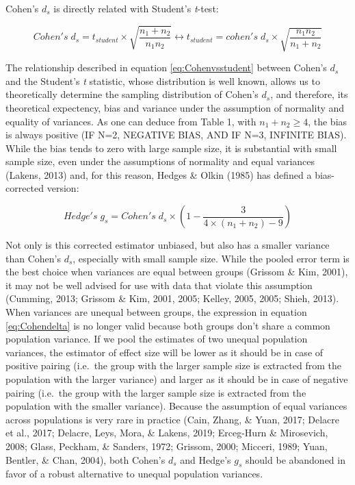 \documentclass[
  man,floatsintext]{apa6}
\begin{document}
Cohen's \(d_{s}\) is directly related with Student's \emph{t}-test:

\begin{equation} 
Cohen's \; d_s = t_{student} \times \sqrt{\frac{n_1+n_2}{n_1n_2}} \leftrightarrow t_{student} = cohen's \; d_s \times \sqrt{\frac{n_1n_2}{n_1+n_2}}
\label{eq:Cohenvsstudent}
\end{equation}

The relationship described in equation \ref{eq:Cohenvsstudent} between Cohen's \(d_s\) and the Student's \emph{t} statistic, whose distribution is well known, allows us to theoretically determine the sampling distribution of Cohen's \(d_s\), and therefore, its theoretical expectency, bias and variance under the assumption of normality and equality of variances. As one can deduce from Table 1, with \(n_1+n_2 \ge 4\), the bias is always positive (IF N=2, NEGATIVE BIAS, AND IF N=3, INFINITE BIAS). While the bias tends to zero with large sample size, it is substantial with small sample size, even under the assumptions of normality and equal variances (Lakens, 2013) and, for this reason, Hedges \& Olkin (1985) has defined a bias-corrected version:

\begin{equation} 
Hedge's \; g_s = Cohen's \; d_s \times (1-\frac{3}{4 \times (n_1+n_2)-9}) 
\label{eq:Hedgesgs}
\end{equation}

Not only is this corrected estimator unbiased, but also has a smaller variance than Cohen's \(d_s\), especially with small sample size. While the pooled error term is the best choice when variances are equal between groups (Grissom \& Kim, 2001), it may not be well advised for use with data that violate this assumption (Cumming, 2013; Grissom \& Kim, 2001, 2005; Kelley, 2005, 2005; Shieh, 2013). When variances are unequal between groups, the expression in equation \ref{eq:Cohendelta} is no longer valid because both groups don't share a common population variance. If we pool the estimates of two unequal population variances, the estimator of effect size will be lower as it should be in case of positive pairing (i.e.~the group with the larger sample size is extracted from the population with the larger variance) and larger as it should be in case of negative pairing (i.e.~the group with the larger sample size is extracted from the population with the smaller variance). Because the assumption of equal variances across populations is very rare in practice (Cain, Zhang, \& Yuan, 2017; Delacre et al., 2017; Delacre, Leys, Mora, \& Lakens, 2019; Erceg-Hurn \& Mirosevich, 2008; Glass, Peckham, \& Sanders, 1972; Grissom, 2000; Micceri, 1989; Yuan, Bentler, \& Chan, 2004), both Cohen's \(d_s\) and Hedge's \(g_s\) should be abandoned in favor of a robust alternative to unequal population variances.
\end{document}
